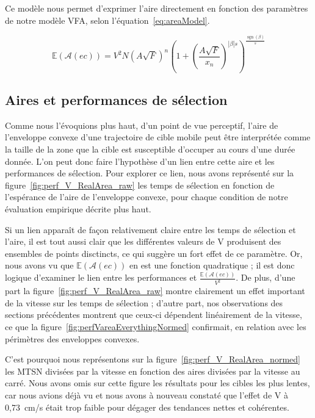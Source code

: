 	Ce modèle nous permet d'exprimer l'aire directement en fonction des paramètres de notre modèle VFA, selon l'équation~\ref{eq:areaModel}.
	
	\begin{equation}
		\mathbb{E}(\mathcal{A}(ec)) = V^{2}N \left( A\sqrt{F} \right)^n \left(1+\left(\frac{A\sqrt{F}}{x_n}\right)^{|\beta|s}\right)^{\frac{\operatorname{sgn}(\beta)}{s}}
		\label{eq:areaModel}
	\end{equation}
	
	\subsection{Aires et performances de sélection}
	\label{sub:areaVperf}
	Comme nous l'évoquions plus haut, d'un point de vue perceptif, l'aire de l'enveloppe convexe d'une trajectoire de cible mobile peut être interprétée comme la taille de la zone que la cible est susceptible d'occuper au cours d'une durée donnée. L'on peut donc faire l'hypothèse d'un lien entre cette aire et les performances de sélection. Pour explorer ce lien, nous avons représenté sur la figure~\ref{fig:perf_V_RealArea_raw} les temps de sélection en fonction de l'espérance de l'aire de l'enveloppe convexe, pour chaque condition de notre évaluation empirique décrite plus haut.
	
	
	Si un lien apparaît de façon relativement claire entre les temps de sélection et l'aire, il est tout aussi clair que les différentes valeurs de V produisent des ensembles de points disctincts, ce qui suggère un fort effet de ce paramètre. Or, nous avons vu que $\mathbb{E}(\mathcal{A}(ec))$ en est une fonction quadratique ; il est donc logique d'examiner le lien entre les performances et $\frac{\mathbb{E}(\mathcal{A}(ec))}{V^{2}}$. De plus, d'une part la figure~\ref{fig:perf_V_RealArea_raw} montre clairement un effet important de la vitesse sur les temps de sélection ; d'autre part, nos observations des sections précédentes montrent que ceux-ci dépendent linéairement de la vitesse, ce que la figure~\ref{fig:perfVareaEverythingNormed} confirmait, en relation avec les périmètres des enveloppes convexes.
	
	C'est pourquoi nous représentons sur la figure~\ref{fig:perf_V_RealArea_normed} les MTSN divisées par la vitesse en fonction des aires divisées par la vitesse au carré. Nous avons omis sur cette figure les résultats pour les cibles les plus lentes, car nous avions déjà vu et nous avons à nouveau constaté que l'effet de V à 0,73~cm/s était trop faible pour dégager des tendances nettes et cohérentes.
	
